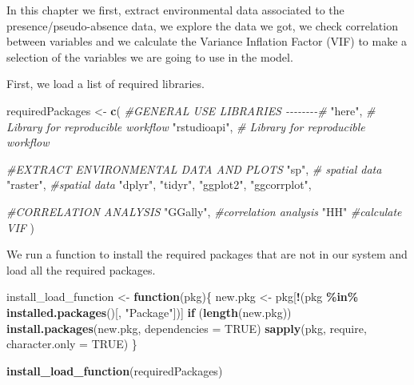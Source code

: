 \documentclass[
]{book}
\newenvironment{Shaded}{\begin{snugshade}}{\end{snugshade}}
\newcommand{\AttributeTok}[1]{\textcolor[rgb]{0.13,0.29,0.53}{#1}}
\newcommand{\CommentTok}[1]{\textcolor[rgb]{0.56,0.35,0.01}{\textit{#1}}}
\newcommand{\ConstantTok}[1]{\textcolor[rgb]{0.56,0.35,0.01}{#1}}
\newcommand{\ControlFlowTok}[1]{\textcolor[rgb]{0.13,0.29,0.53}{\textbf{#1}}}
\newcommand{\FunctionTok}[1]{\textcolor[rgb]{0.13,0.29,0.53}{\textbf{#1}}}
\newcommand{\NormalTok}[1]{#1}
\newcommand{\OtherTok}[1]{\textcolor[rgb]{0.56,0.35,0.01}{#1}}
\newcommand{\SpecialCharTok}[1]{\textcolor[rgb]{0.81,0.36,0.00}{\textbf{#1}}}
\newcommand{\StringTok}[1]{\textcolor[rgb]{0.31,0.60,0.02}{#1}}
\begin{document}
In this chapter we first, extract environmental data associated to the presence/pseudo-absence data, we explore the data we got, we check correlation between variables and we calculate the Variance Inflation Factor (VIF) to make a selection of the variables we are going to use in the model.

First, we load a list of required libraries.

\begin{Shaded}
\begin{Highlighting}[]
\NormalTok{requiredPackages }\OtherTok{\textless{}{-}} \FunctionTok{c}\NormalTok{(}
  \CommentTok{\#GENERAL USE LIBRARIES {-}{-}{-}{-}{-}{-}{-}{-}\#}
  \StringTok{"here"}\NormalTok{, }\CommentTok{\# Library for reproducible workflow}
  \StringTok{"rstudioapi"}\NormalTok{,  }\CommentTok{\# Library for reproducible workflow}
  
  \CommentTok{\#EXTRACT ENVIRONMENTAL DATA AND PLOTS}
  \StringTok{"sp"}\NormalTok{, }\CommentTok{\# spatial data}
  \StringTok{"raster"}\NormalTok{, }\CommentTok{\#spatial data}
  \StringTok{"dplyr"}\NormalTok{,}
  \StringTok{"tidyr"}\NormalTok{,}
  \StringTok{"ggplot2"}\NormalTok{,}
  \StringTok{"ggcorrplot"}\NormalTok{,}
  
  \CommentTok{\#CORRELATION ANALYSIS}
  \StringTok{"GGally"}\NormalTok{, }\CommentTok{\#correlation analysis}
  \StringTok{"HH"} \CommentTok{\#calculate VIF}
\NormalTok{    )}
\end{Highlighting}
\end{Shaded}

We run a function to install the required packages that are not in our system and load all the required packages.

\begin{Shaded}
\begin{Highlighting}[]
\NormalTok{install\_load\_function }\OtherTok{\textless{}{-}} \ControlFlowTok{function}\NormalTok{(pkg)\{}
\NormalTok{  new.pkg }\OtherTok{\textless{}{-}}\NormalTok{ pkg[}\SpecialCharTok{!}\NormalTok{(pkg }\SpecialCharTok{\%in\%} \FunctionTok{installed.packages}\NormalTok{()[, }\StringTok{"Package"}\NormalTok{])]}
  \ControlFlowTok{if}\NormalTok{ (}\FunctionTok{length}\NormalTok{(new.pkg))}
    \FunctionTok{install.packages}\NormalTok{(new.pkg, }\AttributeTok{dependencies =} \ConstantTok{TRUE}\NormalTok{)}
  \FunctionTok{sapply}\NormalTok{(pkg, require, }\AttributeTok{character.only =} \ConstantTok{TRUE}\NormalTok{)}
\NormalTok{\}}

\FunctionTok{install\_load\_function}\NormalTok{(requiredPackages)}
\end{Highlighting}
\end{Shaded}
\end{document}
